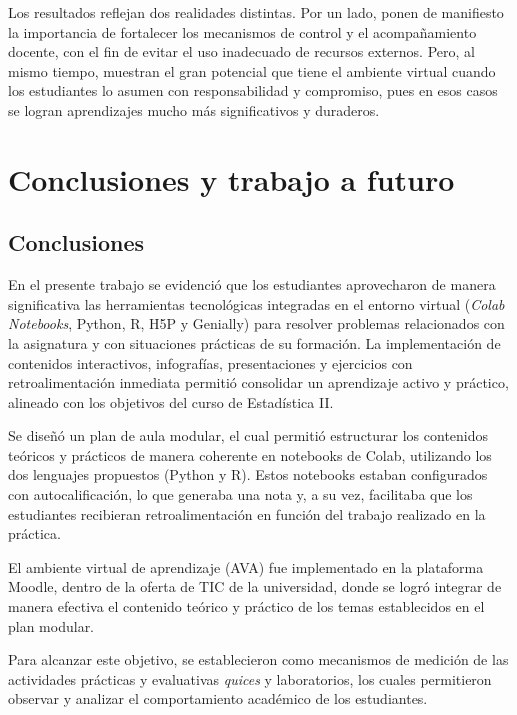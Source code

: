 \documentclass[letter,oneside,12pt,spanish]{report}
\begin{document}
Los resultados reflejan dos realidades distintas. Por un lado, ponen de manifiesto la importancia de fortalecer los mecanismos de control y el acompañamiento docente, con el fin de evitar el uso inadecuado de recursos externos. Pero, al mismo tiempo, muestran el gran potencial que tiene el ambiente virtual cuando los estudiantes lo asumen con responsabilidad y compromiso, pues en esos casos se logran aprendizajes mucho más significativos y duraderos.

\newpage

\chapter{Conclusiones y trabajo a futuro}

\section{Conclusiones}

En el presente trabajo se evidenció que los estudiantes aprovecharon de manera significativa las herramientas tecnológicas integradas en el entorno virtual (\textit{Colab Notebooks}, Python, R, H5P y Genially) para resolver problemas relacionados con la asignatura y con situaciones prácticas de su formación. La implementación de contenidos interactivos, infografías, presentaciones y ejercicios con retroalimentación inmediata permitió consolidar un aprendizaje activo y práctico, alineado con los objetivos del curso de Estadística II.

Se diseñó un plan de aula modular, el cual permitió estructurar los contenidos teóricos y prácticos de manera coherente en notebooks de Colab, utilizando los dos lenguajes propuestos (Python y R). Estos notebooks estaban configurados con autocalificación, lo que generaba una nota y, a su vez, facilitaba que los estudiantes recibieran retroalimentación en función del trabajo realizado en la práctica. 

El ambiente virtual de aprendizaje (AVA) fue implementado en la plataforma Moodle, dentro de la oferta de TIC de la universidad, donde se logró integrar de manera efectiva el contenido teórico y práctico de los temas establecidos en el plan modular.

Para alcanzar este objetivo, se establecieron como mecanismos de medición de las actividades prácticas y evaluativas \textit{quices} y laboratorios, los cuales permitieron observar y analizar el comportamiento académico de los estudiantes.
\end{document}
